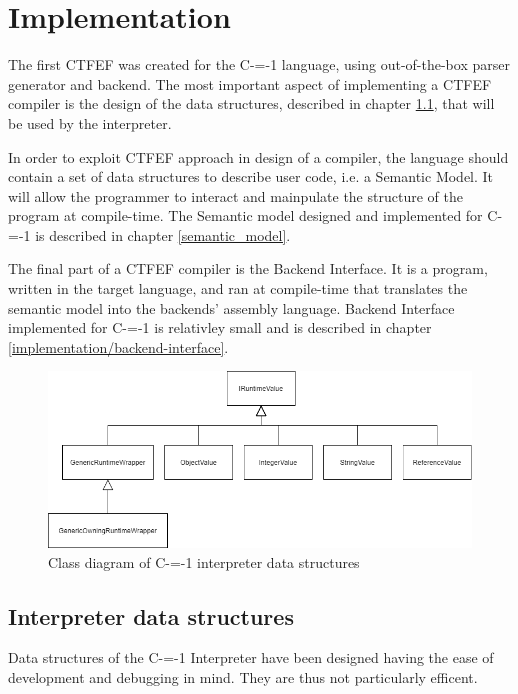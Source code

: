 \section{Implementation}
\label{implementation}

The first CTFEF was created for the C-=-1 language, using out-of-the-box parser generator and backend.
The most important aspect of implementing a CTFEF compiler is the design of the data structures, described in chapter \ref{data_structures}, that will be used by the interpreter.

In order to exploit CTFEF approach in design of a compiler, the language should contain a set of data structures to describe user code, i.e. a Semantic Model.
It will allow the programmer to interact and mainpulate the structure of the program at compile-time.
The Semantic model designed and implemented for C-=-1 is described in chapter \ref{semantic_model}.

The final part of a CTFEF compiler is the Backend Interface.
It is a program, written in the target language, and ran at compile-time that translates the semantic model into the backends' assembly language.
Backend Interface implemented for C-=-1 is relativley small and is described in chapter \ref{implementation/backend-interface}.

\begin{figure}
	\includegraphics[width=16cm]{pictures/interpreter_data_structures_uml.png}
	\caption{Class diagram of C-=-1 interpreter data structures}
	\label{fig:interpreter_data_structures}
\end{figure}

\subsection{Interpreter data structures}
\label{data_structures}
Data structures of the C-=-1 Interpreter have been designed having the ease of development and debugging in mind.
They are thus not particularly efficent.

